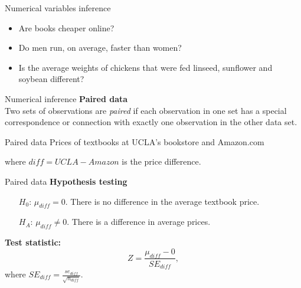\documentclass[12pt,a4paper]{beamer}
\begin{document}
\begin{frame}{Numerical variables inference}
	\begin{itemize}
		\item Are books cheaper online?
		\item Do men run, on average, faster than women?
		\item Is the average weights of chickens that were fed linseed, sunflower and soybean different?
	\end{itemize}
\end{frame}
\begin{frame}{Numerical inference}
	\textbf{Paired data}\\
	Two sets of observations are \emph{paired} if each observation in one set has a special correspondence or connection with exactly one observation in the other data set.
\end{frame}
\begin{frame}{Paired data}
	Prices of textbooks at UCLA's bookstore and Amazon.com
	\begin{table}[h]
	\centering
	\end{table}
	where $diff=UCLA-Amazon$ is the price difference.
\end{frame}
\begin{frame}{Paired data}
	\textbf{Hypothesis testing}
	\begin{itemize}
	\setlength{\itemsep}{0mm}
	\item[$H_0$:] $\mu_{diff}=0$. There is no difference in the average textbook price.
	\item[$H_A$:] $\mu_{diff} \neq 0$. There is a difference in average prices.
	\end{itemize}
	\textbf{Test statistic:}
	\[Z=\frac{\mu_{diff}-0}{SE_{diff}},\]
	where $SE_{diff}=\frac{se_{diff}}{\sqrt{n_{diff}}}.$
\end{frame}
\end{document}
